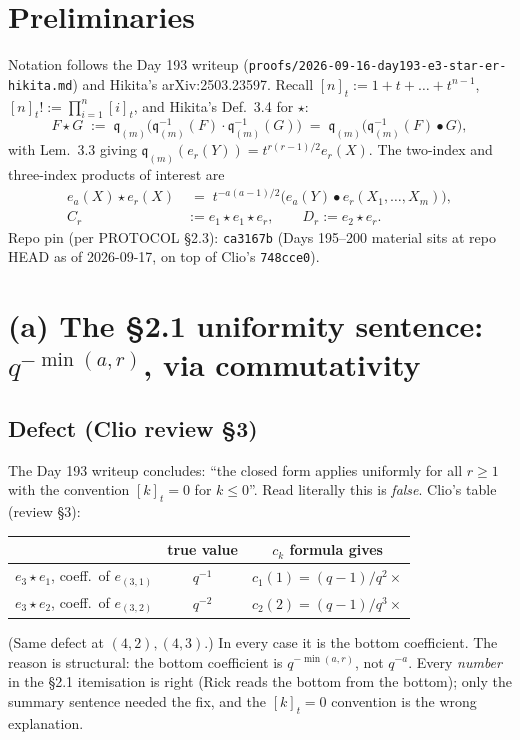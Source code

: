 \documentclass[11pt]{article}
\theoremstyle{definition}
\newcommand{\qi}[1]{[#1]_t}
\newcommand{\bul}{\bullet}
\newcommand{\qm}{\mathfrak q}
\begin{document}
\section*{Preliminaries}
Notation follows the Day 193 writeup
(\texttt{proofs/2026-09-16-day193-e3-star-er-hikita.md}) and
Hikita's arXiv:2503.23597. Recall $\qi n := 1+t+\dots+t^{n-1}$,
$\qi n! := \prod_{i=1}^n\qi i$, and Hikita's Def.\ 3.4 for $\star$:
\begin{equation}\label{eq:star-def}
  F\star G \;:=\; \qm_{(m)}\!\bigl(\qm_{(m)}^{-1}(F)\cdot\qm_{(m)}^{-1}(G)\bigr)
        \;=\; \qm_{(m)}\!\bigl(\qm_{(m)}^{-1}(F)\bul G\bigr),
\end{equation}
with Lem.\ 3.3 giving $\qm_{(m)}(e_r(Y))=t^{r(r-1)/2}e_r(X)$.
The two-index and three-index products of interest are
\begin{align}
  e_a(X)\star e_r(X) &\;=\; t^{-a(a-1)/2}\bigl(e_a(Y)\bul e_r(X_1,\dots,X_m)\bigr),\\
  C_r &:= e_1\star e_1\star e_r,\qquad D_r := e_2\star e_r.
\end{align}
Repo pin (per PROTOCOL \S 2.3): \texttt{ca3167b}
(Days 195--200 material sits at repo HEAD as of 2026-09-17, on top
of Clio's \texttt{748cce0}).

\section{(a) The \S 2.1 uniformity sentence: $q^{-\min(a,r)}$, via commutativity}
\label{sec:min-fix}

\subsection*{Defect (Clio review \S 3)}
The Day 193 writeup concludes: ``the closed form applies uniformly for
all $r\ge 1$ with the convention $\qi k = 0$ for $k\le 0$''. Read
literally this is \emph{false}. Clio's table (review \S 3):
\begin{center}\small
\begin{tabular}{lcc}
& true value & $c_k$ formula gives \\ \hline
$e_3\star e_1$, coeff.\ of $e_{(3,1)}$ & $q^{-1}$ & $c_1(1)=(q-1)/q^2\times$ \\
$e_3\star e_2$, coeff.\ of $e_{(3,2)}$ & $q^{-2}$ & $c_2(2)=(q-1)/q^3\times$ \\
\end{tabular}
\end{center}
(Same defect at $(4,2),(4,3)$.) In every case it is the bottom
coefficient. The reason is structural: the bottom coefficient is
$q^{-\min(a,r)}$, not $q^{-a}$. Every \emph{number} in the \S 2.1
itemisation is right (Rick reads the bottom from the bottom); only
the summary sentence needed the fix, and the $\qi k=0$ convention is
the wrong explanation.
\end{document}
